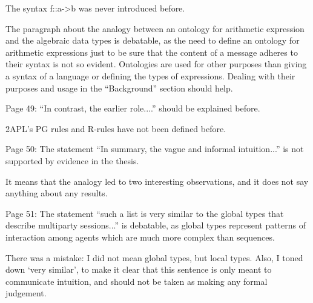 \documentclass{article}
\newcommand{\todo}[1]{[\textcolor{red}{TODO}: #1]}
\newenvironment{them}{\noindent\begingroup\color{blue}}{\endgroup\par}
\begin{document}
\begin{them}

The syntax f::a->b was never introduced before.
\end{them}
\todo{?}

\begin{them}

The paragraph about the analogy between an ontology for arithmetic expression
and the algebraic data types is debatable, as the need to define an ontology
for arithmetic expressions just to be sure that the content of a message
adheres to their syntax is not so evident. Ontologies are used for other
purposes than giving a syntax of a language or defining the types of
expressions. Dealing with their purposes and usage in the “Background” section
should help.

\end{them}
\todo{?}

\begin{them}

Page 49:
“In contrast, the earlier role....” should be explained before.
\end{them}
\todo{?}

\begin{them}

2APL's PG rules and R-rules have not been defined before.
\end{them}
\todo{define 2APL's rules}

\begin{them}

Page 50:
The statement “In summary, the vague and informal intuition...” is not
supported by evidence in the thesis.

\end{them}
It means that the analogy led to two interesting observations, and it does not
say anything about any results.

\begin{them}

Page 51:
The statement “such a list is very similar to the global types that describe
multiparty sessions...” is debatable, as global types represent patterns of
interaction among agents which are much more complex than sequences.

\end{them}

There was a mistake: I did not mean global types, but local types.
Also, I toned down `very similar',
  to make it clear that this sentence is only meant to communicate intuition,
and should not be taken as making any formal judgement.
\end{document}
